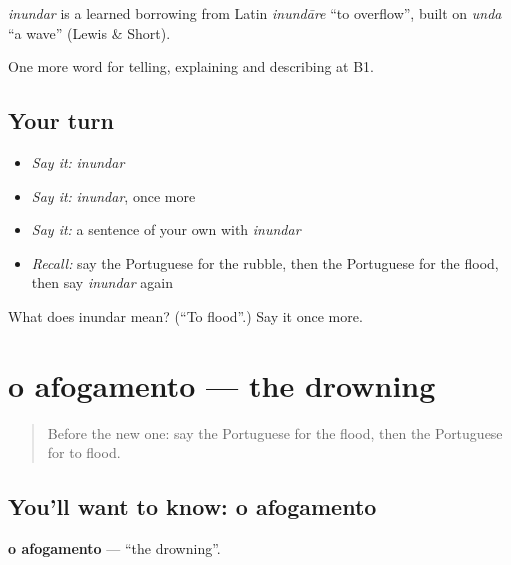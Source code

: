\begin{cousinweb}
\emph{inundar} is a learned borrowing from Latin \emph{inundāre} \textquotedblleft{}to overflow\textquotedblright{}, built on \emph{unda} \textquotedblleft{}a wave\textquotedblright{} (Lewis \& Short).
\end{cousinweb}

\begin{grammarlens}[title={What you've built}]
One more word for telling, explaining and describing at B1.
\end{grammarlens}

\subsection*{Your turn}
\begin{itemize}
\raggedright
  \item \emph{Say it:} \emph{inundar}
  \item \emph{Say it:} \emph{inundar}, once more
  \item \emph{Say it:} a sentence of your own with \emph{inundar}
  \item \emph{Recall:} say the Portuguese for the rubble, then the Portuguese for the flood, then say \emph{inundar} again
\end{itemize}

\begin{tcolorbox}[breakable,colback=teal!4,colframe=teal!35!black,title={Before you move on}]
What does inundar mean? (\textquotedblleft{}To flood\textquotedblright{}.) Say it once more.
\end{tcolorbox}
\section[o afogamento]{o afogamento — the drowning}

\label{lesson:PT-C303-afogamento}



\begin{quote}
Before the new one: say the Portuguese for the flood, then the Portuguese for to flood.
\end{quote}

\subsection*{You'll want to know: o afogamento}
\textbf{o afogamento} — \textquotedblleft{}the drowning\textquotedblright{}.

